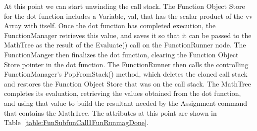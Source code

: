 At this point we can start unwinding the call stack.  The Function Object Store for the dot function
includes a Variable, val, that has the scalar product of the vv Array with itself.  Once the dot
function has completed execution, the FunctionManager retrieves this value, and saves it so that it
can be passed to the MathTree as the result of the Evaluate() call on the FunctionRunner node.  The
FunctionManger then finalizes the dot function, clearing the Function Object Store pointer in the
dot function.  The FunctionRunner then calls the controlling FunctionManager's PopFromStack()
method, which deletes the cloned call stack and restores the Function Object Store that was on the
call stack.  The MathTree completes its evaluation, retrieving the values obtained from the dot
function, and using that value to build the resultant needed by the Assignment command that contains
the MathTree.  The attributes at this point are shown in
Table~\ref{table:FunSubfunCall1FunRunmagDone}.

